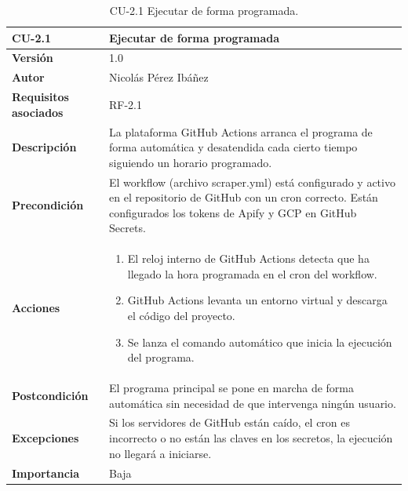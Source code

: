 \begin{table}[p]
	\centering
	\begin{tabularx}{\linewidth}{ p{} p{} }
		\toprule
		\textbf{CU-2.1}  & \textbf{Ejecutar de forma programada}\\
		\toprule
		\textbf{Versión}              & 1.0    \\
		\textbf{Autor}                & Nicolás Pérez Ibáñez \\
		\textbf{Requisitos asociados} & RF-2.1 \\
		\textbf{Descripción}          & La plataforma GitHub Actions arranca el programa de forma automática y desatendida cada cierto tiempo siguiendo un horario programado. \\
		\textbf{Precondición}         & El workflow (archivo scraper.yml) está configurado y activo en el repositorio de GitHub con un cron correcto.
        Están configurados los tokens de Apify y GCP en GitHub Secrets.\\
		\textbf{Acciones}             &
		\begin{enumerate}
			\def\labelenumi{\arabic{enumi}.}
			\tightlist
			\item El reloj interno de GitHub Actions detecta que ha llegado la hora programada en el cron del workflow.
			\item GitHub Actions levanta un entorno virtual y descarga el código del proyecto.
			\item Se lanza el comando automático que inicia la ejecución del programa.
		\end{enumerate}\\
		\textbf{Postcondición}        & El programa principal se pone en marcha de forma automática sin necesidad de que intervenga ningún usuario. \\
		\textbf{Excepciones}          & Si los servidores de GitHub están caído, el cron es incorrecto o no están las claves en los secretos, la ejecución no llegará a iniciarse. \\
		\textbf{Importancia}          & Baja \\
		\bottomrule
	\end{tabularx}
	\caption{CU-2.1 Ejecutar de forma programada.}
\end{table}

